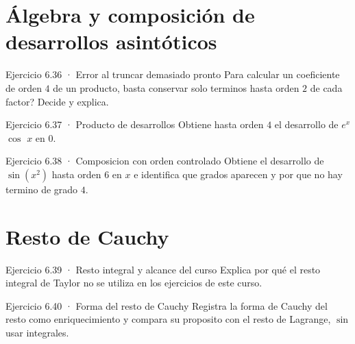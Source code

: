 \documentclass[10pt,a4paper,oneside,openany]{book}
\begin{document}
\section{Álgebra y composición de desarrollos asintóticos}
\begin{PSevenExerciseFixed}{Ejercicio 6.36 · Error al truncar demasiado pronto}
Para calcular un coeficiente de orden \(4\) de un producto, basta conservar solo terminos hasta orden \(2\) de cada factor? Decide y explica.
\end{PSevenExerciseFixed}
\begin{PSevenExerciseFixed}{Ejercicio 6.37 · Producto de desarrollos}
Obtiene hasta orden \(4\) el desarrollo de \(e^x\) \(\cos\) \(x\) en \(0\).
\end{PSevenExerciseFixed}
\begin{PSevenExerciseFixed}{Ejercicio 6.38 · Composicion con orden controlado}
Obtiene el desarrollo de \(\sin(x^{2})\) hasta orden \(6\) en \(x\) e identifica que grados aparecen y por que no hay termino de grado \(4\).
\end{PSevenExerciseFixed}
\section{Resto de Cauchy}
\begin{PSevenExerciseFixed}{Ejercicio 6.39 · Resto integral y alcance del curso}
Explica por qué el resto integral de Taylor no se utiliza en los ejercicios de este curso.
\end{PSevenExerciseFixed}
\begin{PSevenExerciseFixed}{Ejercicio 6.40 · Forma del resto de Cauchy}
Registra la forma de Cauchy del resto como enriquecimiento y compara su proposito con el resto de Lagrange, \(\sin\) usar integrales.
\end{PSevenExerciseFixed}
\end{document}
